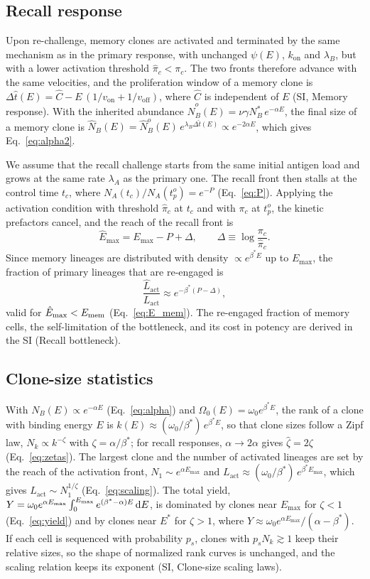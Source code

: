 \documentclass[aps, pre, twocolumn, 10pt, groupedaddress, superscriptaddress, linenumbers]{revtex4-2}
\newcommand{\EQ}{\begin{equation}}
\newcommand{\EE}{\end{equation}}
\newcommand{\on}{\text{on}}
\newcommand{\off}{\text{off}}
\newcommand{\act}{\text{act}}
\newcommand{\DG}{E}
\renewcommand{\d}{{\rm d}}
\newcommand{\lam}{\lambda}
\begin{document}
\subsection*{Recall response}
Upon re-challenge, memory clones are activated and terminated by the same mechanism as in the primary response, with unchanged $\psi(\DG)$, $k_\on$ and $\lam_B$, but with a lower activation threshold $\hat\pi_c < \pi_c$.
The two fronts therefore advance with the same velocities, and the proliferation window of a memory clone is $\Delta\hat t(\DG) = \hat C - \DG\,(1/v_\on + 1/v_\off)$, where $\hat C$ is independent of $\DG$ (SI, Memory response).
With the inherited abundance $\hat N_B^o(\DG) = \nu\gamma N_B^*\, e^{-\alpha\DG}$, the final size of a memory clone is $\hat N_B(\DG) = \hat N_B^o(\DG)\, e^{\lam_B \Delta\hat t(\DG)} \propto e^{-2\alpha\DG}$, which gives Eq.~\ref{eq:alpha2}.

We assume that the recall challenge starts from the same initial antigen load and grows at the same rate $\lam_A$ as the primary one.
The recall front then stalls at the control time $t_c$, where $N_A(t_c)/N_A(t_p^o) = e^{-P}$ (Eq.~\ref{eq:P}).
Applying the activation condition with threshold $\hat\pi_c$ at $t_c$ and with $\pi_c$ at $t_p^o$, the kinetic prefactors cancel, and the reach of the recall front is
\EQ
\hat\DG_{\max} = \DG_{\max} - P + \Delta,
\qquad
\Delta \equiv \log\frac{\pi_c}{\hat\pi_c}.
\label{eq:Emax_recall}
\EE
Since memory lineages are distributed with density $\propto e^{\beta^*\DG}$ up to $\DG_{\max}$, the fraction of primary lineages that are re-engaged is
\EQ
\frac{\hat L_\act}{L_\act} \approx e^{-\beta^*(P - \Delta)},
\label{eq:bottleneck}
\EE
valid for $\hat\DG_{\max} < \DG_{\rm mem}$ (Eq.~\ref{eq:E_mem}).
The re-engaged fraction of memory cells, the self-limitation of the bottleneck, and its cost in potency are derived in the SI (Recall bottleneck).

\subsection*{Clone-size statistics}
With $N_B(\DG) \propto e^{-\alpha\DG}$ (Eq.~\ref{eq:alpha}) and $\Omega_0(\DG) = \omega_0 e^{\beta^*\DG}$, the rank of a clone with binding energy $\DG$ is $k(\DG) \approx (\omega_0/\beta^*)\,e^{\beta^*\DG}$, so that clone sizes follow a Zipf law, $N_k \propto k^{-\zeta}$ with $\zeta = \alpha/\beta^*$; for recall responses, $\alpha \to 2\alpha$ gives $\hat\zeta = 2\zeta$ (Eq.~\ref{eq:zetas}).
The largest clone and the number of activated lineages are set by the reach of the activation front, $N_1 \sim e^{\alpha\DG_{\max}}$ and $L_\act \approx (\omega_0/\beta^*)\,e^{\beta^*\DG_{\max}}$, which gives $L_\act \sim N_1^{1/\zeta}$ (Eq.~\ref{eq:scaling}).
The total yield, $Y = \omega_0 e^{\alpha\DG_{\max}} \int_0^{\DG_{\max}} e^{(\beta^* - \alpha)\DG}\,\d\DG$, is dominated by clones near $\DG_{\max}$ for $\zeta < 1$ (Eq.~\ref{eq:yield}) and by clones near $\DG^*$ for $\zeta > 1$, where $Y \approx \omega_0 e^{\alpha\DG_{\max}}/(\alpha - \beta^*)$.
If each cell is sequenced with probability $p_s$, clones with $p_s N_k \gtrsim 1$ keep their relative sizes, so the shape of normalized rank curves is unchanged, and the scaling relation keeps its exponent (SI, Clone-size scaling laws).
\end{document}
